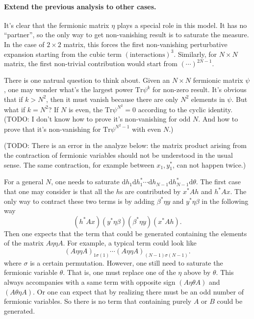 
\paragraph{Extend the previous analysis to other cases.} It's clear that the fermionic matrix $\eta$ plays a special role in this model.
It has no ``partner'', so the only way to get non-vanishing result is to saturate the measure.
In the case of $2\times 2$ matrix, this forces the first non-vanishing perturbative expansion starting from the cubic term $(\text{interactions})^3$.
Similarly, for $N\times N$ matrix, the first non-trivial contribution would start from $(\cdots)^{2N-1}$.

There is one natrual question to think about.
Given an $N \times N$ fermionic matrix $\psi$,
one may wonder what's the largest power $\mathrm{Tr}\psi^k$ for non-zero result.
It's obvious that if $k > N^2$, then it must vanish because there are only $N^2$ elements in $\psi$.
But what if $k=N^2$?
If $N$ is even, the $\mathrm{Tr}\psi^{N^2} = 0$ according to the cyclic identity.
(TODO: I don't know how to prove it's non-vanishing for odd $N$. And how to prove that it's non-vanishing for $\mathrm{Tr}\psi^{N^2-1}$ with even $N$.)

(TODO: There is an error in the analyze below: 
the matrix product arising from the contraction of fermionic variables should not be understood in the usual sense.
The same contraction, for example between $x_1,y_1^*$, can not happen twice.)

For a general $N$, one needs to saturate $\mathrm{d}h_1 \mathrm{d}h_1^* \cdots \mathrm{d}h_{N-1} \mathrm{d}h_{N-1}^* \mathrm{d}\theta$.
The first case that one may consider is that
all the $h$s are contributed by $ x^* A h$ and $ h^* A x$.
The only way to contract these two terms is by adding $ \beta^* \eta y$ and $ y^* \eta \beta$ in the following way
\[
	(h^* A x) (y^* \eta \beta) (\beta^* \eta y) (x^* A h)
.\] 
Then one expects that the term that could be generated containing the elements of the matrix $ A \eta \eta A $.
For example, a typical term could look like
\[
	(A \eta \eta A)_{1 \sigma(1)} \cdots (A \eta \eta A)_{(N-1)\sigma(N-1)}
.\] 
where $\sigma$ is a certain permutation.
However, one still need to saturate the fermionic variable $\theta$.
That is, one must replace one of the $\eta$ above by $\theta$.
This always accompanies with a same term with opposite sign $(A\eta \theta A)$ and $(A\theta\eta A)$.
Or one can expect that by realizing there must be an odd number of fermionic variables.
So there is no term that containing purely $A$ or $B$ could be generated.

